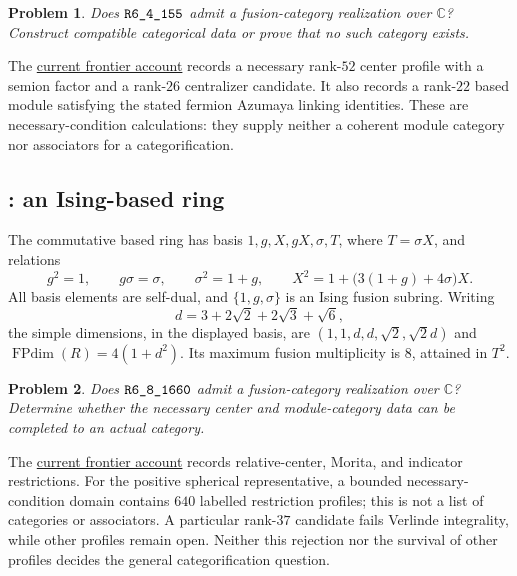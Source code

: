 \documentclass[11pt,a4paper]{article}
\newcommand{\FPdim}{\operatorname{FPdim}}
\newcommand{\caseid}[1]{\texttt{\detokenize{#1}}}
\newcommand{\snap}{https://github.com/sebastienpalcoux/grothendieck-ring-classification/blob/e34396cd95aff1090c10974dd934fe6054ca45eb}
\newcommand{\prooflink}[2]{\href{\snap/#1}{#2}}
\newtheorem{problem}{Problem}
\begin{document}
\begin{problem}
Does $\caseid{R6_4_155}$ admit a fusion-category realization over
$\mathbb C$? Construct compatible categorical data or prove that no such
category exists.
\end{problem}

The \prooflink{supplements/rank6/research/frontier/R6_4_155/README.md}{current frontier account}
records a necessary rank-$52$ center profile with a semion factor and
a rank-$26$ centralizer candidate. It also records a rank-$22$ based
module satisfying the stated fermion Azumaya linking identities.
These are necessary-condition calculations: they supply neither a
coherent module category nor associators for a categorification.

\subsection*{\caseid{R6_8_1660}: an Ising-based ring}
The commutative based ring has basis $1,g,X,gX,\sigma,T$, where
$T=\sigma X$, and relations
\[
 g^2=1,\qquad g\sigma=\sigma,\qquad \sigma^2=1+g,
 \qquad X^2=1+\bigl(3(1+g)+4\sigma\bigr)X.
\]
All basis elements are self-dual, and $\{1,g,\sigma\}$ is an Ising
fusion subring. Writing
\[
 d=3+2\sqrt2+2\sqrt3+\sqrt6,
\]
the simple dimensions, in the displayed basis, are
$(1,1,d,d,\sqrt2,\sqrt2d)$ and $\FPdim(R)=4(1+d^2)$.
Its maximum fusion multiplicity is $8$, attained in $T^2$.

\begin{problem}
Does $\caseid{R6_8_1660}$ admit a fusion-category realization over
$\mathbb C$? Determine whether the necessary center and module-category
data can be completed to an actual category.
\end{problem}

The \prooflink{supplements/rank6/research/frontier/R6_8_1660/README.md}{current frontier account}
records relative-center, Morita, and indicator restrictions. For the
positive spherical representative, a bounded necessary-condition domain
contains $640$ labelled restriction profiles;
this is not a list of categories or associators. A particular rank-$37$
candidate fails Verlinde integrality, while other profiles remain open.
Neither this rejection nor the survival of other profiles decides the
general categorification question.
\end{document}

